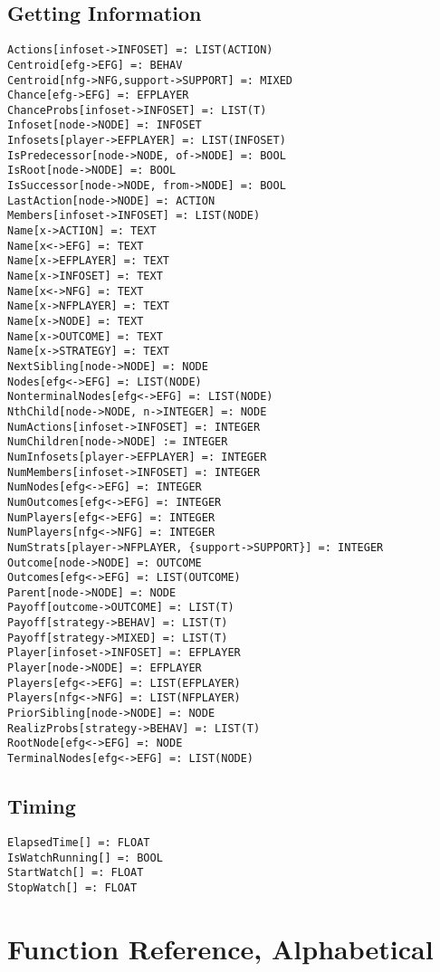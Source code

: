 \subsection{Getting Information}

\begin{verbatim}
Actions[infoset->INFOSET] =: LIST(ACTION)
Centroid[efg->EFG] =: BEHAV
Centroid[nfg->NFG,support->SUPPORT] =: MIXED
Chance[efg->EFG] =: EFPLAYER
ChanceProbs[infoset->INFOSET] =: LIST(T)
Infoset[node->NODE] =: INFOSET
Infosets[player->EFPLAYER] =: LIST(INFOSET)
IsPredecessor[node->NODE, of->NODE] =: BOOL
IsRoot[node->NODE] =: BOOL
IsSuccessor[node->NODE, from->NODE] =: BOOL
LastAction[node->NODE] =: ACTION
Members[infoset->INFOSET] =: LIST(NODE)
Name[x->ACTION] =: TEXT
Name[x<->EFG] =: TEXT
Name[x->EFPLAYER] =: TEXT
Name[x->INFOSET] =: TEXT
Name[x<->NFG] =: TEXT
Name[x->NFPLAYER] =: TEXT
Name[x->NODE] =: TEXT
Name[x->OUTCOME] =: TEXT
Name[x->STRATEGY] =: TEXT
NextSibling[node->NODE] =: NODE
Nodes[efg<->EFG] =: LIST(NODE)
NonterminalNodes[efg<->EFG] =: LIST(NODE)
NthChild[node->NODE, n->INTEGER] =: NODE
NumActions[infoset->INFOSET] =: INTEGER
NumChildren[node->NODE] := INTEGER
NumInfosets[player->EFPLAYER] =: INTEGER
NumMembers[infoset->INFOSET] =: INTEGER
NumNodes[efg<->EFG] =: INTEGER
NumOutcomes[efg<->EFG] =: INTEGER
NumPlayers[efg<->EFG] =: INTEGER
NumPlayers[nfg<->NFG] =: INTEGER
NumStrats[player->NFPLAYER, {support->SUPPORT}] =: INTEGER
Outcome[node->NODE] =: OUTCOME
Outcomes[efg<->EFG] =: LIST(OUTCOME)
Parent[node->NODE] =: NODE
Payoff[outcome->OUTCOME] =: LIST(T)
Payoff[strategy->BEHAV] =: LIST(T)
Payoff[strategy->MIXED] =: LIST(T)
Player[infoset->INFOSET] =: EFPLAYER
Player[node->NODE] =: EFPLAYER
Players[efg<->EFG] =: LIST(EFPLAYER)
Players[nfg<->NFG] =: LIST(NFPLAYER)
PriorSibling[node->NODE] =: NODE
RealizProbs[strategy->BEHAV] =: LIST(T)
RootNode[efg<->EFG] =: NODE
TerminalNodes[efg<->EFG] =: LIST(NODE)
\end{verbatim}

\subsection{Timing}

\begin{verbatim}
ElapsedTime[] =: FLOAT
IsWatchRunning[] =: BOOL
StartWatch[] =: FLOAT
StopWatch[] =: FLOAT
\end{verbatim}


\section{Function Reference, Alphabetical}

